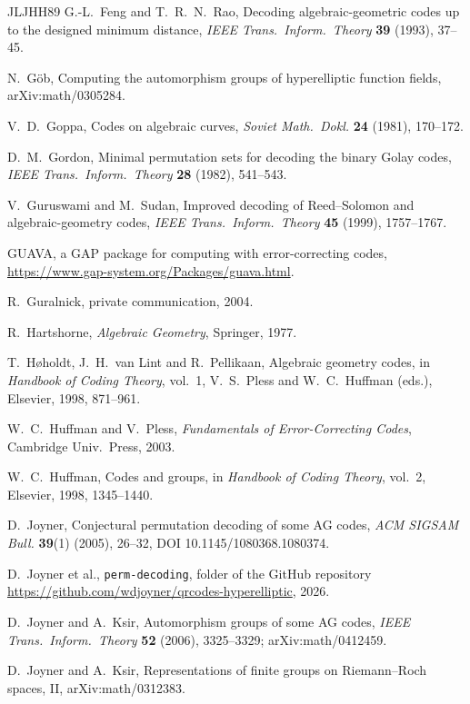 \documentclass[12pt,letterpaper]{article}
\theoremstyle{definition}
\theoremstyle{remark}
\numberwithin{equation}{section}
\begin{document}
\begin{thebibliography}{JLJHH89}
 G.-L.~Feng and T.~R.~N.~Rao, Decoding
algebraic-geometric codes up to the designed minimum distance,
\emph{IEEE Trans.\ Inform.\ Theory} \textbf{39} (1993), 37--45.

 N.~G\"ob, Computing the automorphism groups of
hyperelliptic function fields, arXiv:math/0305284.

 V.~D.~Goppa, Codes on algebraic curves,
\emph{Soviet Math.\ Dokl.} \textbf{24} (1981), 170--172.

 D.~M.~Gordon, Minimal permutation sets for
decoding the binary Golay codes, \emph{IEEE Trans.\ Inform.\ Theory}
\textbf{28} (1982), 541--543.

 V.~Guruswami and M.~Sudan, Improved decoding of
Reed--Solomon and algebraic-geometry codes, \emph{IEEE Trans.\ Inform.\
Theory} \textbf{45} (1999), 1757--1767.

 GUAVA, a GAP package for computing with
error-correcting codes, \url{https://www.gap-system.org/Packages/guava.html}.

 R.~Guralnick, private communication, 2004.

 R.~Hartshorne, \emph{Algebraic Geometry}, Springer, 1977.

 T.~H{\o}holdt, J.~H.~van Lint and R.~Pellikaan,
Algebraic geometry codes, in \emph{Handbook of Coding Theory}, vol.~1,
V.~S.~Pless and W.~C.~Huffman (eds.), Elsevier, 1998, 871--961.

 W.~C.~Huffman and V.~Pless, \emph{Fundamentals of
Error-Correcting Codes}, Cambridge Univ.\ Press, 2003.

 W.~C.~Huffman, Codes and groups, in \emph{Handbook
of Coding Theory}, vol.~2, Elsevier, 1998, 1345--1440.

 D.~Joyner, Conjectural permutation decoding of some
AG codes, \emph{ACM SIGSAM Bull.} \textbf{39}(1) (2005), 26--32,
DOI 10.1145/1080368.1080374.

 D.~Joyner et al., \texttt{perm-decoding}, folder of
the GitHub repository
\url{https://github.com/wdjoyner/qrcodes-hyperelliptic}, 2026.

 D.~Joyner and A.~Ksir, Automorphism groups of some
AG codes, \emph{IEEE Trans.\ Inform.\ Theory} \textbf{52} (2006),
3325--3329; arXiv:math/0412459.

 D.~Joyner and A.~Ksir, Representations of finite
groups on Riemann--Roch spaces, II, arXiv:math/0312383.


\end{thebibliography}
\end{document}
